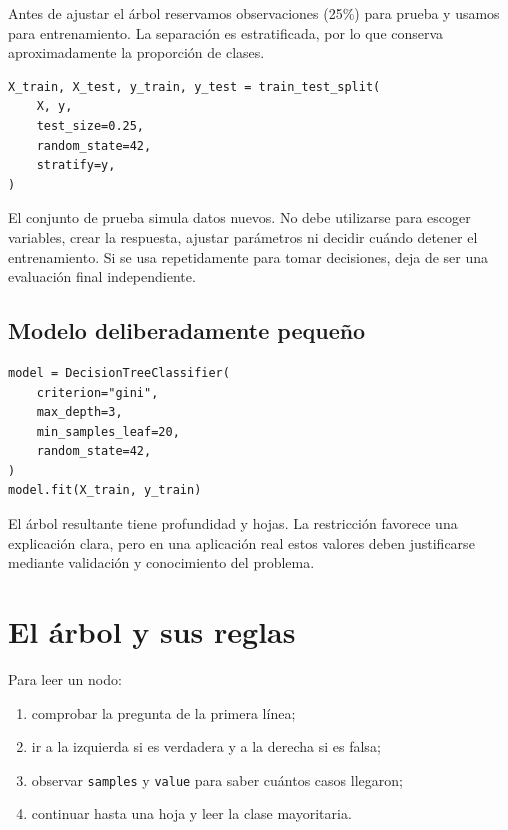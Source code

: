 \documentclass[11pt,oneside,openany]{book}
\begin{document}
Antes de ajustar el árbol reservamos \NTest{} observaciones (25\%) para prueba y
usamos \NTrain{} para entrenamiento. La separación es estratificada, por lo que
conserva aproximadamente la proporción de clases.

\begin{lstlisting}
X_train, X_test, y_train, y_test = train_test_split(
    X, y,
    test_size=0.25,
    random_state=42,
    stratify=y,
)
\end{lstlisting}

\begin{alerta}
El conjunto de prueba simula datos nuevos. No debe utilizarse para escoger
variables, crear la respuesta, ajustar parámetros ni decidir cuándo detener el
entrenamiento. Si se usa repetidamente para tomar decisiones, deja de ser una
evaluación final independiente.
\end{alerta}

\section{Modelo deliberadamente pequeño}

\begin{lstlisting}
model = DecisionTreeClassifier(
    criterion="gini",
    max_depth=3,
    min_samples_leaf=20,
    random_state=42,
)
model.fit(X_train, y_train)
\end{lstlisting}

El árbol resultante tiene profundidad \TreeDepth{} y \TreeLeaves{} hojas. La
restricción favorece una explicación clara, pero en una aplicación real estos
valores deben justificarse mediante validación y conocimiento del problema.

\chapter{El árbol y sus reglas}

Para leer un nodo:

\begin{enumerate}
  \item comprobar la pregunta de la primera línea;
  \item ir a la izquierda si es verdadera y a la derecha si es falsa;
  \item observar \texttt{samples} y \texttt{value} para saber cuántos casos llegaron;
  \item continuar hasta una hoja y leer la clase mayoritaria.
\end{enumerate}
\end{document}
